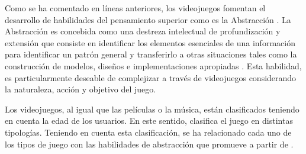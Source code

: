 \documentclass[spanish]{textolivre}
\begin{document}
Como se ha comentado en líneas anteriores, los videojuegos fomentan el desarrollo de habilidades del pensamiento superior como es la Abstracción \cite{mansilla2017}. %
La Abstracción es concebida como una destreza intelectual de profundización y extensión que consiste en identificar los elementos esenciales de una información para identificar un patrón general y transferirlo a otras situaciones \cite{beas2014} %
tales como la construcción de modelos, diseños e implementaciones apropiadas \cite{serna2011}. %
Esta habilidad, es particularmente deseable de complejizar a través de videojuegos considerando la naturaleza, acción y objetivo del juego.

Los videojuegos, al igual que las películas o la música, están clasificados teniendo en cuenta la edad de los usuarios. En este sentido, \textcite{sedeno2010} %
clasifica el juego en distintas tipologías. Teniendo en cuenta esta clasificación, se ha relacionado cada uno de los tipos de juego con las habilidades de abstracción que promueve  a partir de \textcite{marzano2005}. %
\end{document}
